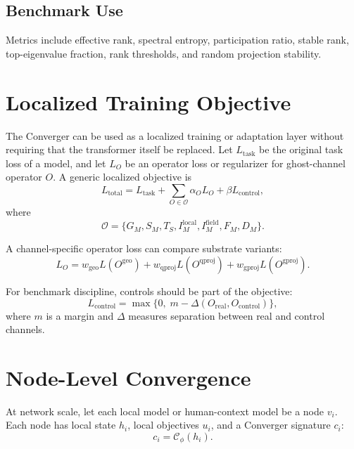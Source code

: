 \documentclass[11pt]{article}
\newcommand{\Gm}{G_M}
\newcommand{\Sm}{S_M}
\newcommand{\Ts}{T_S}
\newcommand{\Iml}{I_M^{\mathrm{local}}}
\newcommand{\Imf}{I_M^{\mathrm{field}}}
\newcommand{\Fm}{F_M}
\newcommand{\Dm}{D_M}
\newcommand{\geo}{\mathrm{geo}}
\newcommand{\qproj}{\mathrm{qproj}}
\newcommand{\gproj}{\mathrm{gproj}}
\newcommand{\Converger}{\mathcal{C}}
\begin{document}
\subsection{Benchmark Use}

Metrics include effective rank, spectral entropy, participation ratio, stable
rank, top-eigenvalue fraction, rank thresholds, and random projection stability.

\section{Localized Training Objective}

The Converger can be used as a localized training or adaptation layer without
requiring that the transformer itself be replaced. Let \(L_{\mathrm{task}}\) be
the original task loss of a model, and let \(L_O\) be an operator loss or
regularizer for ghost-channel operator \(O\). A generic localized objective is
\begin{equation}
  L_{\mathrm{total}}
  =
  L_{\mathrm{task}}
  +
  \sum_{O\in\mathcal{O}}
  \alpha_O L_O
  +
  \beta L_{\mathrm{control}},
\end{equation}
where
\[
  \mathcal{O}
  =
  \{\Gm,\Sm,\Ts,\Iml,\Imf,\Fm,\Dm\}.
\]

A channel-specific operator loss can compare substrate variants:
\begin{equation}
  L_O =
  w_{\geo} L(O^{\geo})
  +
  w_{\qproj} L(O^{\qproj})
  +
  w_{\gproj} L(O^{\gproj}).
\end{equation}

For benchmark discipline, controls should be part of the objective:
\begin{equation}
  L_{\mathrm{control}}
  =
  \max\{0,\; m - \Delta(O_{\mathrm{real}},O_{\mathrm{control}})\},
\end{equation}
where \(m\) is a margin and \(\Delta\) measures separation between real and
control channels.

\section{Node-Level Convergence}

At network scale, let each local model or human-context model be a node
\(v_i\). Each node has local state \(h_i\), local objectives \(u_i\), and a
Converger signature \(c_i\):
\begin{equation}
  c_i =
  \Converger_\phi(h_i).
\end{equation}
\end{document}
